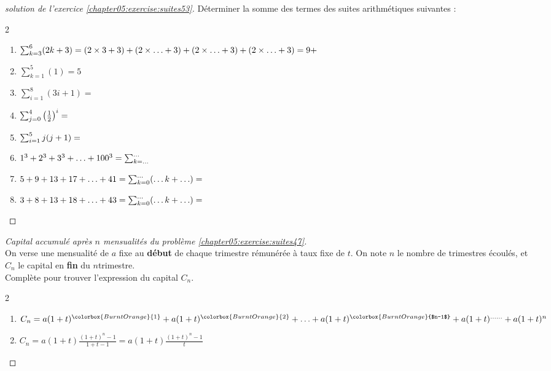 \documentclass[main.tex]{subfiles}
\begin{document}
\begin{proof}[solution de l'exercice \ref{chapter05:exercise:suites53}] 	Déterminer la somme des termes des suites arithmétiques suivantes :
	\begin{spacing}{2}
		\vspace{-0.5em}
		\begin{enumerate}[leftmargin=*,label={}]
			\item $\sum_{k=3}^6(2k+3)=(2\times 3 +3) + (2\times \ldots +3)+(2\times \ldots +3)+(2\times \ldots +3)= 9+ \dotfill $
			\item  $\sum_{k=1}^5(1)=  $\colorbox{BurntOrange}{$5 $}  
			\item  $\sum_{i=1}^8(3i+1)=  $
			\item  $\sum_{j=0}^4\left(\frac{1}{2}\right)^i=\dotfill $
			\item $\sum_{i=1}^5 j(j+1)=\dotfill $
			\item $1^3+2^3+3^3+\ldots +100^3 = \sum_{k=\ldots}^{\ldots}\dotfill $
			\item $5+9+13+17 +\ldots + 41 = \sum_{k=0}^{\ldots}(\ldots k+ \ldots )=\dotfill $ 
			\item $3+8+13+18 +\ldots + 43 = \sum_{k=0}^{\ldots}(\ldots k+ \ldots )=\dotfill $
		\end{enumerate}
	\end{spacing}
	\vspace{-0.75em}
\end{proof} 

\begin{proof}[Capital accumulé après $n$ mensualités du problème  \ref{chapter05:exercise:suites47}]\hfill \\
On verse une mensualité de $a$ fixe au \textbf{début} de chaque trimestre rémunérée à taux fixe de $t$. On note $n$ le nombre de trimestres écoulés, et $C_n$ le capital en \textbf{fin} du  $n$\ieme trimestre. \\
Complète pour trouver l'expression du capital $C_n$.

\begin{spacing}{2}
	\vspace{-0.5em}
	\begin{enumerate}[leftmargin=*,label={}]  
		\item $		C_n=a(1+t)^{\colorbox{BurntOrange}{1}}+a(1+t)^{\colorbox{BurntOrange}{2}}+\ldots +a(1+t)^{\colorbox{BurntOrange}{$n-1$}}+a(1+t)^{\ldots\ldots}+a(1+t)^{n}$
		\item $C_n=$\colorbox{BurntOrange}{$a(1+t)\frac{(1+t)^{n}-1}{1+t-1}=a(1+t)\frac{(1+t)^n-1}{t}$} 
	\end{enumerate}
\end{spacing}
\vspace{-0.75em} 
\end{proof}
\end{document}
